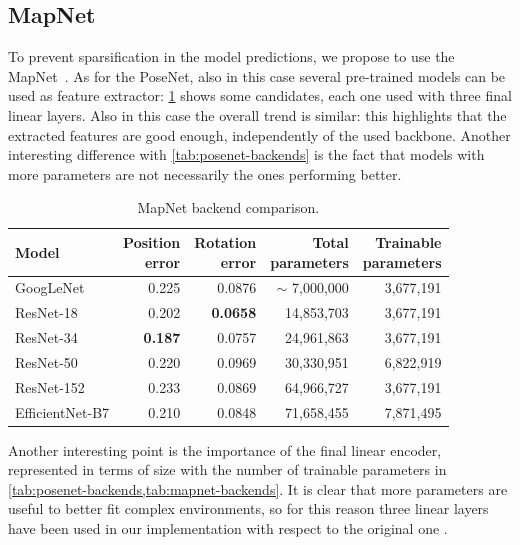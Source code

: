 \subsection{MapNet}
To prevent sparsification in the model predictions, we propose to use the MapNet~\cite{mapnet}. As for the PoseNet, also in this case several pre-trained models can be used as feature extractor: \cref{tab:mapnet-backends} shows some candidates, each one used with three final linear layers.
Also in this case the overall trend is similar: this highlights that the extracted features are good enough, independently of the used backbone. Another interesting difference with \cref{tab:posenet-backends} is the fact that models with more parameters are not necessarily the ones performing better.
\begin{table}[htbp]
    \caption{MapNet backend comparison.}
    \begin{center}
        \begin{tabular}{lrrrr}
            \toprule
            {Model}         & \thead{Position                                                  \\error} & \thead{Rotation\\error} & \thead{Total\\parameters} & \thead{Trainable\\parameters} \\
            \midrule
            GoogLeNet       & 0.225           & 0.0876          & $\sim$ 7,000,000 & 3,677,191 \\
            ResNet-18       & 0.202           & \textbf{0.0658} & 14,853,703       & 3,677,191 \\
            ResNet-34       & \textbf{0.187}  & 0.0757          & 24,961,863       & 3,677,191 \\
            ResNet-50       & 0.220           & 0.0969          & 30,330,951       & 6,822,919 \\
            ResNet-152      & 0.233           & 0.0869          & 64,966,727       & 3,677,191 \\
            EfficientNet-B7 & 0.210           & 0.0848          & 71,658,455       & 7,871,495 \\
            \bottomrule
        \end{tabular}
        \label{tab:mapnet-backends}
    \end{center}
\end{table}

Another interesting point is the importance of the final linear encoder, represented in terms of size with the number of trainable parameters in \cref{tab:posenet-backends,tab:mapnet-backends}. It is clear that more parameters are useful to better fit complex environments, so for this reason three linear layers have been used in our implementation with respect to the original one \cite{mapnet}.


